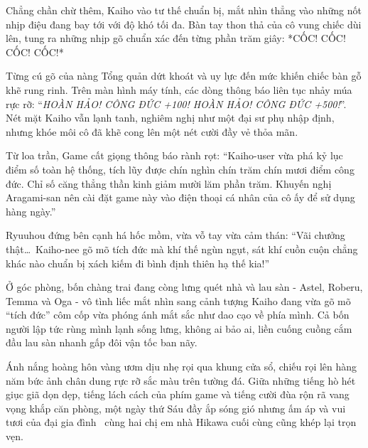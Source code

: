\documentclass[../main.tex]{subfiles}
\begin{document}
Chẳng chần chừ thêm, Kaiho vào tư thế chuẩn bị, mắt nhìn thẳng vào những nốt nhịp điệu đang bay tới với độ khó tối đa. Bàn tay thon thả của cô vung chiếc dùi lên, tung ra những nhịp gõ chuẩn xác đến từng phần trăm giây: *CỐC! CỐC! CỐC! CỐC!*

Từng cú gõ của nàng Tổng quản dứt khoát và uy lực đến mức khiến chiếc bàn gỗ khẽ rung rinh. Trên màn hình máy tính, các dòng thông báo liên tục nhảy múa rực rỡ: ``\textit{HOÀN HẢO! CÔNG ĐỨC +100! HOÀN HẢO! CÔNG ĐỨC +500!}''. Nét mặt Kaiho vẫn lạnh tanh, nghiêm nghị như một đại sư phụ nhập định, nhưng khóe môi cô đã khẽ cong lên một nét cười đầy vẻ thỏa mãn.

Từ loa trần, Game cất giọng thông báo rành rọt: ``Kaiho-user vừa phá kỷ lục điểm số toàn hệ thống, tích lũy được chín nghìn chín trăm chín mươi điểm công đức. Chỉ số căng thẳng thần kinh giảm mười lăm phần trăm. Khuyến nghị Aragami-san nên cài đặt game này vào điện thoại cá nhân của cô ấy để sử dụng hàng ngày.''

Ryuuhou đứng bên cạnh há hốc mồm, vừa vỗ tay vừa cảm thán: ``Vãi chưởng thật\dots\ Kaiho-nee gõ mõ tích đức mà khí thế ngùn ngụt, sát khí cuồn cuộn chẳng khác nào chuẩn bị xách kiếm đi bình định thiên hạ thế kia!''

Ở góc phòng, bốn chàng trai đang còng lưng quét nhà và lau sàn - Astel, Roberu, Temma và Oga - vô tình liếc mắt nhìn sang cảnh tượng Kaiho đang vừa gõ mõ ``tích đức'' côm cốp vừa phóng ánh mắt sắc như dao cạo về phía mình. Cả bốn người lập tức rùng mình lạnh sống lưng, không ai bảo ai, liền cuống cuồng cắm đầu lau sàn nhanh gấp đôi vận tốc ban nãy.

Ánh nắng hoàng hôn vàng ươm dịu nhẹ rọi qua khung cửa sổ, chiếu rọi lên hàng năm bức ảnh chân dung rực rỡ sắc màu trên tường đá. Giữa những tiếng hò hét giục giã dọn dẹp, tiếng lách cách của phím game và tiếng cười đùa rộn rã vang vọng khắp căn phòng, một ngày thứ Sáu đầy ắp sóng gió nhưng ấm áp và vui tươi của đại gia đình \hls\ cùng hai chị em nhà Hikawa cuối cùng cũng khép lại trọn vẹn.
\end{document}
